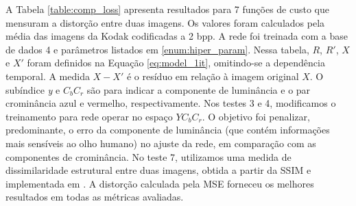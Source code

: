 





A Tabela \ref{table:comp_loss} apresenta resultados para 7 funções de custo que mensuram a distorção entre duas imagens.  Os valores foram calculados pela média das imagens da Kodak codificadas a 2 bpp. A rede foi treinada com a base de dados 4 e parâmetros listados em	\ref{enum:hiper_param}. Nessa tabela, $R$, $R'$, $X$ e $X'$ foram definidos na Equação \ref{eq:model_1it}, omitindo-se a dependência temporal. A medida $X-X'$ é o resíduo em relação à imagem original  $X$.  
O subíndice \textit{y} e \textit{$C_bC_r$} são para indicar a componente de luminância e o par crominância azul e vermelho, respectivamente. Nos testes 3 e 4, modificamos o treinamento para rede operar no espaço $YC_bC_r$. O objetivo foi penalizar, predominante, o erro da componente de luminância (que contém informações mais sensíveis ao olho humano) no ajuste da rede, em comparação com as componentes de crominância.
No teste 7, utilizamos uma medida de dissimilaridade estrutural entre duas imagens, obtida a partir da SSIM e implementada em \cite{su2017}.  A distorção calculada pela MSE forneceu os melhores resultados em todas as métricas avaliadas. 


